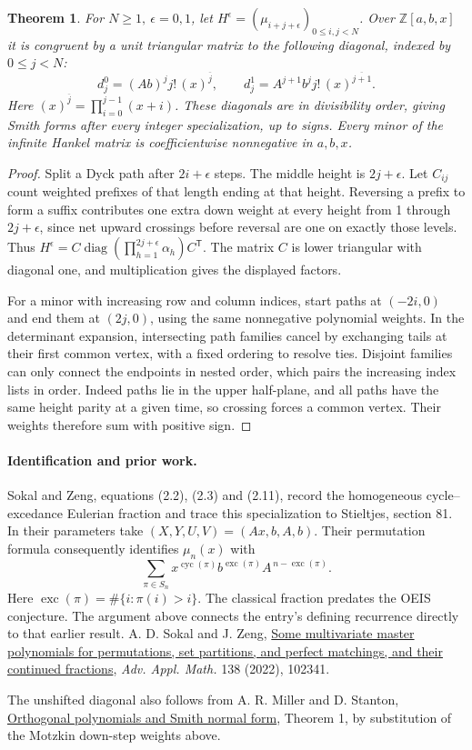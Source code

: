 \documentclass[11pt,letterpaper]{article}
\newtheorem{theorem}{Theorem}
\begin{document}
\begin{theorem}
For \(N\ge1,\ \epsilon=0,1\), let \(H^\epsilon=(\mu_{i+j+\epsilon})_{0\le i,j<N}\). Over \(\mathbb Z[a,b,x]\) it is congruent by a unit triangular matrix to the following diagonal, indexed by \(0\le j<N\):
\[
 d_j^0=(Ab)^j j!\,(x)^{\overline j},\qquad
 d_j^1=A^{j+1}b^j j!\,(x)^{\overline{j+1}} .
\]
Here \((x)^{\overline j}=\prod_{i=0}^{j-1}(x+i)\). These diagonals are in divisibility order, giving Smith forms after every integer specialization, up to signs. Every minor of the infinite Hankel matrix is coefficientwise nonnegative in \(a,b,x\).
\end{theorem}
\begin{proof}
Split a Dyck path after \(2i+\epsilon\) steps. The middle height is \(2j+\epsilon\). Let \(C_{ij}\) count weighted prefixes of that length ending at that height. Reversing a prefix to form a suffix contributes one extra down weight at every height from 1 through \(2j+\epsilon\), since net upward crossings before reversal are one on exactly those levels. Thus \(H^\epsilon=C\operatorname{diag}(\prod_{h=1}^{2j+\epsilon}\alpha_h)C^\mathsf T\). The matrix \(C\) is lower triangular with diagonal one, and multiplication gives the displayed factors.

For a minor with increasing row and column indices, start paths at \((-2i,0)\) and end them at \((2j,0)\), using the same nonnegative polynomial weights. In the determinant expansion, intersecting path families cancel by exchanging tails at their first common vertex, with a fixed ordering to resolve ties. Disjoint families can only connect the endpoints in nested order, which pairs the increasing index lists in order. Indeed paths lie in the upper half-plane, and all paths have the same height parity at a given time, so crossing forces a common vertex. Their weights therefore sum with positive sign.
\end{proof}

\paragraph{Identification and prior work.}
Sokal and Zeng, equations (2.2), (2.3) and (2.11), record the homogeneous cycle--excedance Eulerian fraction and trace this specialization to Stieltjes, section 81. In their parameters take \((X,Y,U,V)=(Ax,b,A,b)\). Their permutation formula consequently identifies \(\mu_n(x)\) with
\[
 \sum_{\pi\in S_n}x^{\operatorname{cyc}(\pi)}
             b^{\operatorname{exc}(\pi)} A^{\,n-\operatorname{exc}(\pi)} .
\]
Here \(\operatorname{exc}(\pi)=\#\{i:\pi(i)>i\}\). The classical fraction predates the OEIS conjecture. The argument above connects the entry's defining recurrence directly to that earlier result. A. D. Sokal and J. Zeng, \href{https://doi.org/10.1016/j.aam.2022.102341}{Some multivariate master polynomials for permutations, set partitions, and perfect matchings, and their continued fractions}, \emph{Adv. Appl. Math.} 138 (2022), 102341.

The unshifted diagonal also follows from A. R. Miller and D. Stanton,
\href{https://arxiv.org/abs/1704.03539}{Orthogonal polynomials and Smith normal form},
Theorem 1, by substitution of the Motzkin down-step weights above.
\end{document}
